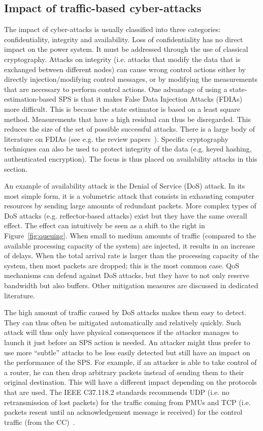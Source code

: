 \subsection{Impact of traffic-based cyber-attacks}
\label{sec:ICTtrafficAttack}

The impact of cyber-attacks is usually classified into three categories: confidentiality, integrity and availability. Loss of confidentiality has no direct impact on the power system. It must be addressed through the use of classical cryptography. Attacks on integrity (i.e. attacks that modify the data that is exchanged between different nodes) can cause wrong control actions either by directly injection/modifying control messages, or by modifying the measurements that are necessary to perform control actions. One advantage of using a state-estimation-based SPS is that it makes False Data Injection Attacks (FDIAs) more difficult. This is because the state estimator is based on a least square method. Measurements that have a high residual can thus be disregarded. This reduces the size of the set of possible successful attacks. There is a large body of literature on FDIAs (see e.g. the review papers~\cite{FDIAreview, FDIAreview2}). Specific cryptography techniques can also be used to protect integrity of the data (e.g. keyed hashing, authenticated encryption). The focus is thus placed on availability attacks in this section.

An example of availability attack is the Denial of Service (DoS) attack. In its most simple form, it is a volumetric attack that consists in exhausting computer resources by sending large amounts of redundant packets. More complex types of DoS attacks (e.g. reflector-based attacks) exist but they have the same overall effect. The effect can intuitively be seen as a shift to the right in Figure~\ref{fig:queuing}. When small to medium amounts of traffic (compared to the available processing capacity of the system) are injected, it results in an increase of delays. When the total arrival rate is larger than the processing capacity of the system, then most packets are dropped; this is the most common case. QoS mechanisms can defend against DoS attacks, but they have to not only reserve bandwidth but also buffers. Other mitigation measures are discussed in dedicated literature.

The high amount of traffic caused by DoS attacks makes them easy to detect. They can thus often be mitigated automatically and relatively quickly. Such attack will thus only have physical consequences if the attacker manages to launch it just before an SPS action is needed. An attacker might thus prefer to use more ``subtle'' attacks to be less easily detected but still have an impact on the performance of the SPS. For example, if an attacker is able to take control of a router, he can then drop arbitrary packets instead of sending them to their original destination. This will have a different impact depending on the protocols that are used. The IEEE C37.118.2 standards recommends UDP (i.e. no retransmission of lost packets) for the traffic coming from PMUs and TCP (i.e. packets resent until an acknowledgement message is received) for the control traffic (from the CC)~\cite{StandardC37-118-2}.

